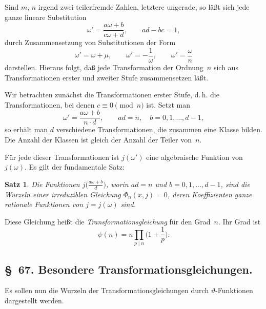 \documentclass[11pt,a4paper]{article}
\theoremstyle{plain}
\newtheorem*{satz}{Satz}
\theoremstyle{remark}
\begin{document}
Sind $m$, $n$ irgend zwei teilerfremde Zahlen, letztere
ungerade, so läßt sich jede ganze lineare Substitution
\begin{equation}\label{eq:66:1}
\omega' = \frac{a\omega+b}{c\omega+d},\qquad
ad-bc = 1,
\end{equation}
durch Zusammensetzung von Substitutionen der Form
\begin{equation}\label{eq:66:2}
\omega' = \omega+\mu,\qquad
\omega' = -\frac{1}{\omega},\qquad
\omega' = \frac{\omega}{n}
\end{equation}
darstellen. Hieraus folgt, daß jede Transformation der
Ordnung~$n$ sich aus Transformationen erster und zweiter Stufe
zusammensetzen läßt.

Wir betrachten zunächst die Transformationen erster Stufe, d.\,h.
die Transformationen, bei denen $c\equiv 0 \pmod{n}$ ist.
Setzt man
\begin{equation}\label{eq:66:3}
\omega' = \frac{a\omega+b}{n\cdot d},\qquad ad=n,\quad b=0,1,\dots,d-1,
\end{equation}
so erhält man $d$ verschiedene Transformationen, die zusammen
eine Klasse bilden. Die Anzahl der Klassen ist gleich der
Anzahl der Teiler von~$n$.

Für jede dieser Transformationen ist $j(\omega')$ eine
algebraische Funktion von $j(\omega)$. Es gilt der fundamentale
Satz:
\begin{satz}
Die Funktionen $j\bigl(\frac{a\omega+b}{d}\bigr)$, worin $ad=n$
und $b=0,1,\dots,d-1$, sind die Wurzeln einer irreduziblen
Gleichung $\Phi_n(x,j)=0$, deren Koeffizienten ganze rationale
Funktionen von $j=j(\omega)$ sind.
\end{satz}

Diese Gleichung heißt die \emph{Transformationsgleichung} für
den Grad~$n$. Ihr Grad ist
\begin{equation}\label{eq:66:4}
\psi(n) = n\prod_{p\mid n}\biggl(1+\frac{1}{p}\biggr).
\end{equation}


\subsection*{§~67. Besondere Transformationsgleichungen.}

Es sollen nun die Wurzeln der Transformationsgleichungen durch
$\vartheta$-Funktionen dargestellt werden.
\end{document}
